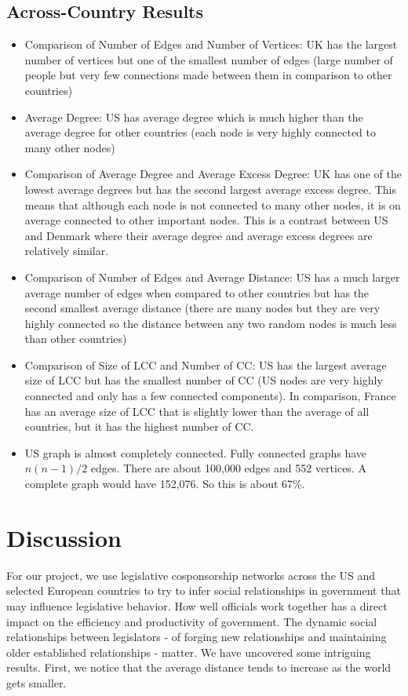 \documentclass[12pt]{article}
\begin{document}
\subsection{Across-Country Results}
\begin{itemize}
  \item Comparison of Number of Edges and Number of Vertices: UK has the largest number of vertices but one of the smallest number of edges (large number of people but very few connections made between them in comparison to other countries)
  \item Average Degree: US has average degree which is much higher than the average degree for other countries (each node is very highly connected to many other nodes)
  \item Comparison of Average Degree and Average Excess Degree: UK has one of the lowest average degrees but has the second largest average excess degree. This means that although each node is not connected to many other nodes, it is on average connected to other important nodes. This is a contrast between US and Denmark where their average degree and average excess degrees are relatively similar. 
  \item Comparison of Number of Edges and Average Distance: US has a much larger average number of edges when compared to other countries but has the second smallest average distance (there are many nodes but they are very highly connected so the distance between any two random nodes is much less than other countries)
  \item Comparison of Size of LCC and Number of CC: US has the largest average size of LCC but has the smallest number of CC (US nodes are very highly connected and only has a few connected components). In comparison, France has an average size of LCC that is slightly lower than the average of all countries, but it has the highest number of CC.
  \item US graph is almost completely connected. Fully connected graphs have $n(n-1)/2$ edges. There are about 100,000 edges and 552 vertices. A complete graph would have 152,076. So this is about 67\%.
\end{itemize}


\section{Discussion}
For our project, we use legislative cosponsorship networks across the US and selected European countries to try to infer social relationships in government that may influence legislative behavior. How well officials work together has a direct impact on the efficiency and productivity of government. The dynamic social relationships between legislators - of forging new relationships and maintaining older established relationships - matter.
We have uncovered some intriguing results. First, we notice that the average distance tends to increase as the world gets smaller. 
\end{document}
